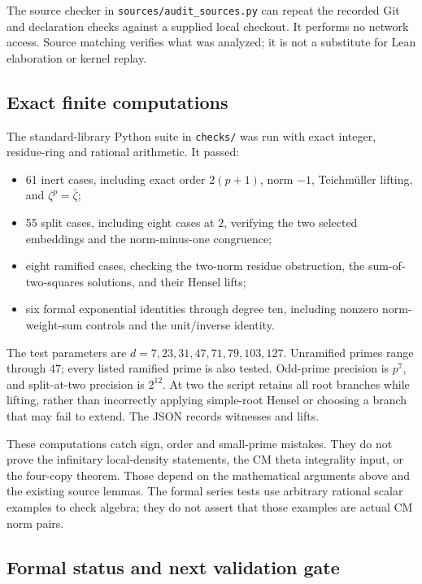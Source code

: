 \documentclass[11pt,letterpaper]{article}
\theoremstyle{remark}\newtheorem{remark}[theorem]{Remark}
\begin{document}
The source checker in \texttt{sources/audit\_sources.py} can repeat
the recorded Git and declaration checks against a supplied local checkout.
It performs no network access. Source matching verifies what was analyzed;
it is not a substitute for Lean elaboration or kernel replay.

\subsection{Exact finite computations}

The standard-library Python suite in \texttt{checks/} was run with exact
integer, residue-ring and rational arithmetic. It passed:
\begin{itemize}
\item 61 inert cases, including exact order $2(p+1)$, norm $-1$,
Teichm\"uller lifting, and $\zeta^p=\bar\zeta$;
\item 55 split cases, including eight cases at $2$, verifying the
two selected embeddings and the norm-minus-one congruence;
\item eight ramified cases, checking the two-norm residue obstruction,
the sum-of-two-squares solutions, and their Hensel lifts;
\item six formal exponential identities through degree ten, including
nonzero norm-weight-sum controls and the unit/inverse identity.
\end{itemize}
The test parameters are $d=7,23,31,47,71,79,103,127$.
Unramified primes range through $47$; every listed ramified prime is also
tested. Odd-prime precision is $p^7$, and split-at-two precision is
$2^{12}$. At two the script retains all root branches while lifting,
rather than incorrectly applying simple-root Hensel or choosing a branch
that may fail to extend. The JSON records witnesses and lifts.

These computations catch sign, order and small-prime mistakes. They do
not prove the infinitary local-density statements, the CM theta
integrality input, or the four-copy theorem. Those depend on the
mathematical arguments above and the existing source lemmas. The formal
series tests use arbitrary rational scalar examples to check algebra;
they do not assert that those examples are actual CM norm pairs.

\subsection{Formal status and next validation gate}
\end{document}
